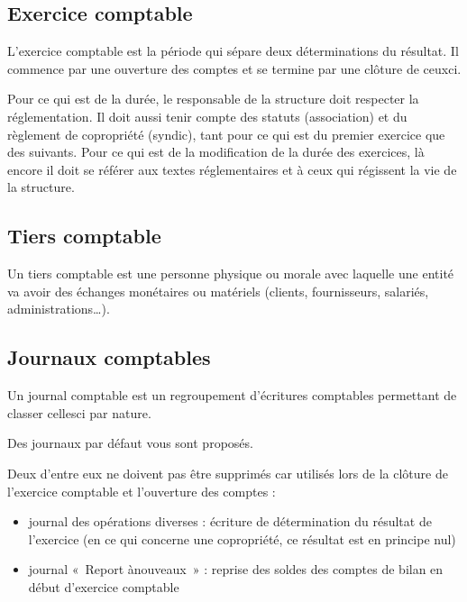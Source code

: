 \documentclass[a4paper,10pt,oneside,french]{sphinxmanual}
\begin{document}
\subsection{Exercice comptable}
\label{\detokenize{accounting/definition:exercice-comptable}}
L’exercice comptable est la période qui sépare deux déterminations du résultat. Il commence par une ouverture des comptes et se termine par une clôture de ceux\sphinxhyphen{}ci.

Pour ce qui est de la durée, le responsable de la structure doit respecter la réglementation. Il doit aussi tenir compte des statuts (association) et du règlement de copropriété (syndic), tant pour ce qui est du premier exercice que des suivants. Pour ce qui est de la modification de la durée des exercices, là encore il doit se référer aux textes réglementaires et à ceux qui régissent la vie de la structure.


\subsection{Tiers comptable}
\label{\detokenize{accounting/definition:tiers-comptable}}
Un tiers comptable est une personne physique ou morale avec laquelle une entité va avoir des échanges monétaires ou matériels (clients, fournisseurs, salariés, administrations…).


\subsection{Journaux comptables}
\label{\detokenize{accounting/definition:journaux-comptables}}
Un journal comptable est un regroupement d’écritures comptables permettant de classer celles\sphinxhyphen{}ci par nature.

Des journaux par défaut vous sont proposés.

Deux d’entre eux ne doivent pas être supprimés car utilisés lors de la clôture de l’exercice comptable et l’ouverture des comptes :
\begin{itemize}
\item {} 
journal des opérations diverses : écriture de détermination du résultat de l’exercice (en ce qui concerne une copropriété, ce résultat est en principe nul)

\item {} 
journal « Report à\sphinxhyphen{}nouveaux » : reprise des soldes des comptes de bilan en début d’exercice comptable

\end{itemize}
\end{document}
